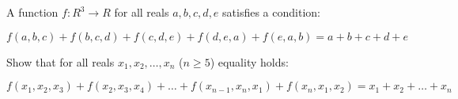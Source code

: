 A function $ f: R^3\rightarrow R$ for all reals $ a,b,c,d,e$ satisfies a condition:

\[ f(a,b,c)+f(b,c,d)+f(c,d,e)+f(d,e,a)+f(e,a,b)=a+b+c+d+e\]

Show that for all reals $ x_1,x_2,\ldots,x_n$ ($ n\geq 5$) equality holds:

\[ f(x_1,x_2,x_3)+f(x_2,x_3,x_4)+\ldots +f(x_{n-1},x_n,x_1)+f(x_n,x_1,x_2)=x_1+x_2+\ldots+x_n\]